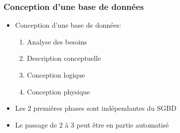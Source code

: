 \begin{frame}
  \frametitle{Conception d'une base de données}
  \begin{itemize}
    \item Conception d'une base de données:
      \begin{enumerate}
        \item Analyse des besoins
        \item Description conceptuelle
        \item Conception logique
        \item Conception physique
      \end{enumerate}
    \item Les 2 premières phases sont indépendantes du SGBD
    \item Le passage de 2 à 3 peut être en partie automatisé
  \end{itemize}
\end{frame}
